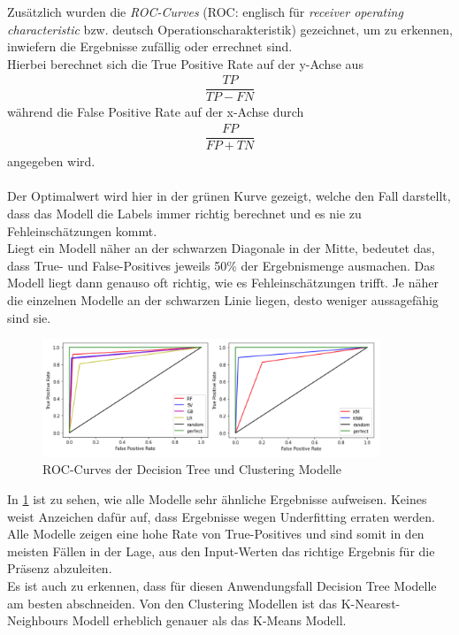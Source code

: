 \newpage
Zusätzlich wurden die \textit{ROC-Curves} (ROC: englisch für \textit{receiver operating characteristic} 
bzw. deutsch Operationscharakteristik) gezeichnet, um zu erkennen, inwiefern die Ergebnisse zufällig 
oder errechnet sind.\\
Hierbei berechnet sich die True Positive Rate auf der y-Achse aus
\begin{align}
    \dfrac{TP}{TP - FN}
\end{align}
während die False Positive Rate auf der x-Achse durch
\begin{align}
    \dfrac{FP}{FP + TN}
\end{align}
angegeben wird.\\\\
Der Optimalwert wird hier in der grünen Kurve gezeigt, welche den Fall darstellt, 
dass das Modell die Labels immer richtig berechnet und es nie zu Fehleinschätzungen kommt.\\
Liegt ein Modell näher an der schwarzen Diagonale in der Mitte, bedeutet das, dass True- und 
False-Positives jeweils 50\% der Ergebnismenge ausmachen. 
Das Modell liegt dann genauso oft richtig, wie es Fehleinschätzungen trifft. 
Je näher die einzelnen Modelle an der schwarzen Linie liegen, desto weniger aussagefähig sind sie. 

\begin{figure}[!h]
    \centering
    \includegraphics[width=0.9\textwidth]{pic/roc_all.png}
    \caption{ROC-Curves der Decision Tree und Clustering Modelle}
    \label{fig:Roc_curves}
\end{figure}
In \ref{fig:Roc_curves} ist zu sehen, wie alle Modelle sehr ähnliche Ergebnisse aufweisen. Keines weist Anzeichen 
dafür auf, dass Ergebnisse wegen Underfitting erraten werden. Alle Modelle zeigen eine hohe Rate von True-Positives und
sind somit in den meisten Fällen in der Lage, aus den Input-Werten das richtige Ergebnis für die Präsenz abzuleiten.\\
Es ist auch zu erkennen, dass für diesen Anwendungsfall Decision Tree Modelle am besten abschneiden.
Von den Clustering Modellen ist das K-Nearest-Neighbours Modell erheblich genauer als das K-Means Modell. 
\newpage

